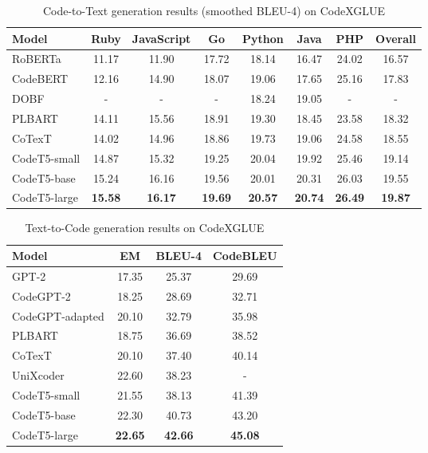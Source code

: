 \documentclass{article}
\begin{document}
\begin{table}[t]
\centering
\caption{Code-to-Text generation results (smoothed BLEU-4) on CodeXGLUE}
\label{app_tab:codexglue_sum}
\begin{tabular}{l|c c c c c c|c}
\hline
Model & Ruby & JavaScript & Go & Python & Java & PHP & Overall \\
\hline
RoBERTa  & 11.17 & 11.90 & 17.72 & 18.14 & 16.47 & 24.02 & 16.57 \\
CodeBERT & 12.16 & 14.90 & 18.07 & 19.06 & 17.65 & 25.16 & 17.83 \\ 
DOBF & -& -& -  &18.24 & 19.05 & - & - \\
PLBART &  14.11 &  15.56 &  18.91 & 19.30 & 18.45 & 23.58 & 18.32\\
CoTexT & 14.02	 &14.96	 &18.86	 &19.73	 &19.06	 &24.58	 & 18.55 \\
CodeT5-small & 14.87&	15.32&	19.25&	20.04&	19.92&	25.46&	19.14\\
CodeT5-base & 15.24&	16.16&	19.56&	20.01&	20.31&	26.03&	19.55\\
\hline
CodeT5-large &\textbf{15.58}	&\textbf{16.17}	&\textbf{19.69}	&\textbf{20.57}	&\textbf{20.74}&	\textbf{26.49}	&\textbf{19.87} \\
\hline
\end{tabular}
\end{table} \begin{table}[t]
\centering
\caption{Text-to-Code generation results on CodeXGLUE}
\label{app_tab:codexglue_gen}
\begin{tabular}{l|ccc}
\hline
Model         & EM    & BLEU-4  & CodeBLEU \\
\hline
GPT-2           & 17.35 & 25.37 & 29.69    \\
CodeGPT-2       & 18.25 & 28.69 & 32.71    \\
CodeGPT-adapted & 20.10 & 32.79 & 35.98    \\
PLBART          & 18.75 & 36.69 & 38.52    \\
CoTexT          & 20.10 & 37.40 & 40.14    \\
UniXcoder       & 22.60 & 38.23 & -        \\
CodeT5-small    & 21.55 & 38.13 & 41.39    \\
CodeT5-base     & 22.30 & 40.73 & 43.20    \\
\hline
CodeT5-large    & \textbf{22.65} & \textbf{42.66} & \textbf{45.08}   \\
\hline
\end{tabular}


\end{table}
\end{document}
